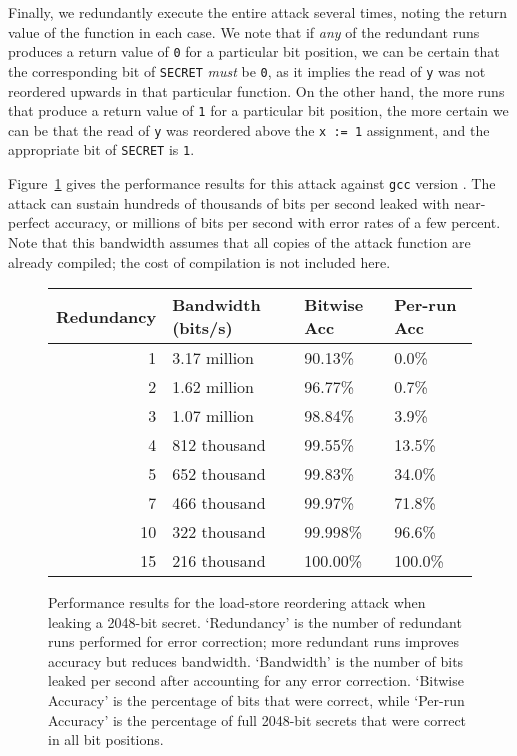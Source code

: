 Finally, we redundantly execute the entire attack several times, noting the
return value of the function in each case.
We note that if \emph{any} of the redundant runs produces a return value of
\verb|0| for a particular bit position, we can be certain that the
corresponding bit of \verb|SECRET| \emph{must} be \verb|0|, as it implies the
read of \verb|y| was not reordered upwards in that particular function.
On the other hand, the more runs that produce a return value of \verb|1| for a
particular bit position, the more certain we can be that the read of \verb|y|
was reordered above the \verb|x := 1| assignment, and the appropriate bit of
\verb|SECRET| is \verb|1|.

Figure~\ref{fig:load-store-perf} gives the performance results for this attack
against \verb|gcc| version .
The attack can sustain hundreds of thousands of bits per second leaked with
near-perfect accuracy, or millions of bits per second with error rates of a
few percent.
Note that this bandwidth assumes that all copies of the attack function are
already compiled; the cost of compilation is not included here.

\begin{figure}
  \begin{tabular}{ r | l | l | l }
    Redundancy & Bandwidth (bits/s) & Bitwise Acc & Per-run Acc \\ \hline
    1          & 3.17 million       & 90.13\%     & 0.0\%       \\
    2          & 1.62 million       & 96.77\%     & 0.7\%       \\
    3          & 1.07 million       & 98.84\%     & 3.9\%       \\
    4          & 812 thousand       & 99.55\%     & 13.5\%      \\
    5          & 652 thousand       & 99.83\%     & 34.0\%      \\
    7          & 466 thousand       & 99.97\%     & 71.8\%      \\
    10         & 322 thousand       & 99.998\%    & 96.6\%      \\
    15         & 216 thousand       & 100.00\%    & 100.0\%     \\
  \end{tabular}
  \caption{
    Performance results for the load-store reordering attack when leaking a
    2048-bit secret.
    `Redundancy' is the number of redundant runs performed for error
    correction; more redundant runs improves accuracy but reduces bandwidth.
    `Bandwidth' is the number of bits leaked per second after accounting for
    any error correction.
    `Bitwise Accuracy' is the percentage of bits that were correct, while
    `Per-run Accuracy' is the percentage of full 2048-bit secrets that were
    correct in all bit positions.
  }
  \label{fig:load-store-perf}
\end{figure}

